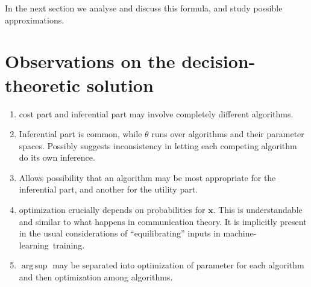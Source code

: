 \documentclass[\ifafour a4paper,12pt,\else a5paper,10pt,\fi%
onecolumn,oneside,article,%
british%
]{memoir}
\makeatletter
\newcommand*{\widefbox}[1]{\fbox{\hspace{1em}#1\hspace{1em}}}
\theoremstyle{remark}
\theoremstyle{innote}
\def\sum{\DOTSI\sumop\slimits@}
\newcommand*{\de}{\partialup}%
\newcommand*{\p}{\mathrm{p}}%
\renewcommand*{\|}[1][]{\nonscript\:#1\vert\nonscript\:\mathopen{}}
\renewcommand*{\=}{\TextOrMath\texteq\eq}
\newcommand*{\tsum}{\mathop{\textstyle\sum}\nolimits}
\DeclareMathOperator*{\argsup}{arg\,sup}
\newcommand*{\ml}{machine-learning}
\newcommand*{\bx}{\bm{x}}
\makeatother
\begin{document}
In the next section we analyse and discuss this formula, and study possible
approximations.

\section{Observations on the decision-theoretic solution}
\label{sec:observations_solution}

\begin{enumerate}[label=(\alph*), wide]
\item cost part and inferential part may involve completely different
  algorithms.

  \item Inferential part is common, while $\theta$ runs over algorithms and
  their parameter spaces. Possibly suggests inconsistency in letting each
  competing algorithm do its own inference.

  \item Allows possibility that an algorithm may be most appropriate for the
  inferential part, and another for the utility part.

  \item optimization crucially depends on probabilities for $\bx$. This is
  understandable and similar to what happens in communication theory. It is
  implicitly present in the usual considerations of \enquote{equilibrating}
  inputs in \ml\ training.

  \item $\argsup$ may be separated into optimization of parameter for each
  algorithm and then optimization among algorithms.
\end{enumerate}



\end{document}
